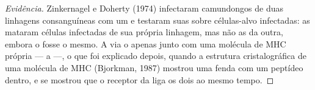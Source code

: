 \begin{proof}[Evidência]
Zinkernagel e Doherty (1974) infectaram camundongos de duas linhagens
consanguíneas com um  e testaram suas  sobre
células-alvo infectadas: as  mataram células infectadas de sua
própria linhagem, mas não as da outra, embora o  fosse o mesmo. A
 via o  apenas junto com uma molécula de MHC própria --- a
\emph{} ---, o que foi explicado depois, quando a
estrutura cristalográfica de uma molécula de MHC (Bjorkman, 1987)
mostrou uma fenda com um peptídeo dentro, e se mostrou que o receptor
da  liga os dois ao mesmo tempo.
\end{proof}

